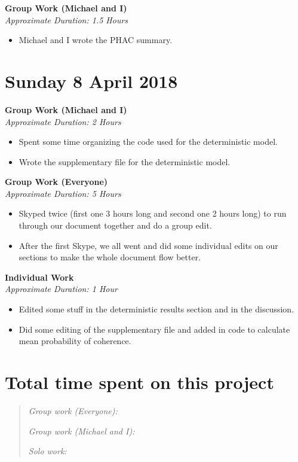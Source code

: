 \documentclass[12pt]{article}\usepackage[]{graphicx}\usepackage[]{color}
\begin{document}

\textbf{Group Work (Michael and I)}\\
\emph{Approximate Duration: 1.5 Hours}
\begin{itemize}
\item Michael and I wrote the PHAC summary.
\end{itemize}

\section*{Sunday 8 April 2018}

\textbf{Group Work (Michael and I)}\\
\emph{Approximate Duration: 2 Hours}
\begin{itemize}
\item Spent some time organizing the code used for the deterministic model.
\item Wrote the supplementary file for the deterministic model.
\end{itemize}

\textbf{Group Work (Everyone)}\\
\emph{Approximate Duration: 5 Hours}
\begin{itemize}
\item Skyped twice (first one 3 hours long and second one 2 hours long) to run through our document together and do a group edit.
\item After the first Skype, we all went and did some individual edits on our sections to make the whole document flow better.
\end{itemize}

\textbf{Individual Work}\\
\emph{Approximate Duration: 1 Hour}
\begin{itemize}
\item Edited some stuff in the deterministic results section and in the discussion.
\item Did some editing of the supplementary file and added in code to calculate mean probability of coherence.
\end{itemize}


\section*{Total time spent on this project}

\begin{quote}

\emph{Group work (Everyone):} 

\emph{Group work (Michael and I):}

\emph{Solo work:}

\end{quote}
\end{document}
